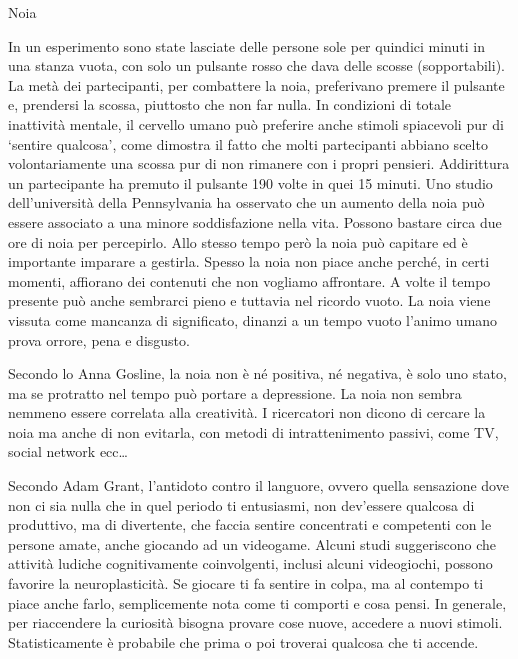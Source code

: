 \documentclass[12pt]{book} %
\begin{document}
\begin{mdframed}[linewidth=1pt]
Noia

In un esperimento sono state lasciate delle persone sole per quindici minuti in una stanza vuota, con solo un pulsante
rosso che dava delle scosse (sopportabili). La metà dei partecipanti, per combattere la noia, preferivano premere il
pulsante e, prendersi la scossa, piuttosto che non far nulla. In condizioni di totale inattività mentale, il cervello umano può preferire anche stimoli spiacevoli pur di ‘sentire qualcosa’, come dimostra il fatto che molti partecipanti abbiano scelto volontariamente una scossa pur di non rimanere con i propri pensieri. Addirittura un partecipante ha premuto il pulsante 190 volte in quei 15
minuti. Uno studio dell'università della Pennsylvania
ha osservato che un aumento della noia può essere associato a una minore soddisfazione nella vita. Possono bastare circa due ore di noia per
percepirlo. Allo stesso tempo però la noia può capitare ed è importante imparare a gestirla.
Spesso la noia non piace anche perché, in certi momenti, affiorano dei contenuti che non vogliamo affrontare. 
A volte il tempo presente può anche sembrarci pieno e tuttavia nel ricordo vuoto. La noia viene vissuta come mancanza
di significato, dinanzi a un tempo vuoto l'animo umano prova orrore, pena e disgusto.

Secondo lo Anna Gosline, la noia non è né positiva, né negativa, è solo uno stato, ma se protratto nel tempo può portare a depressione. La noia non sembra nemmeno essere correlata alla creatività. 
I ricercatori non dicono di cercare la noia ma anche di non evitarla, con metodi di intrattenimento passivi, come TV, social network ecc…

Secondo Adam Grant, l'antidoto contro il languore, ovvero quella sensazione dove non ci sia nulla che in quel periodo ti
entusiasmi, non dev'essere qualcosa di produttivo, ma di divertente, che faccia sentire concentrati e competenti con le
persone amate, anche giocando ad un videogame. Alcuni studi suggeriscono che attività ludiche cognitivamente coinvolgenti, inclusi alcuni videogiochi, possono favorire la neuroplasticità. Se giocare ti fa sentire in colpa, ma al
contempo ti piace anche farlo, semplicemente nota come ti comporti e cosa pensi. In generale, per riaccendere la curiosità bisogna provare cose nuove, accedere a nuovi stimoli. Statisticamente è probabile che prima o poi troverai qualcosa che ti accende.


\end{mdframed}
\end{document}
